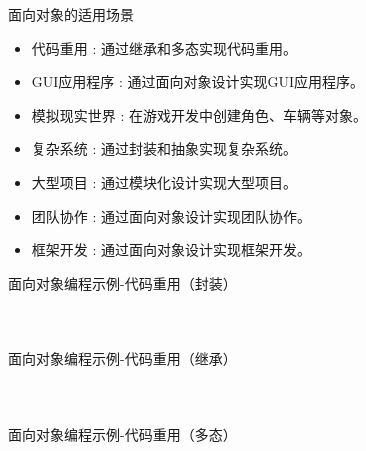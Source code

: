 \documentclass[UTF8,aspectratio=169]{beamer}
\begin{document}
\begin{frame}[fragile]{面向对象的适用场景}
    \begin{itemize}
        \item 代码重用 : 通过继承和多态实现代码重用。
        \item GUI应用程序 : 通过面向对象设计实现GUI应用程序。
        \item 模拟现实世界 : 在游戏开发中创建角色、车辆等对象。
        \item 复杂系统 : 通过封装和抽象实现复杂系统。
        \item 大型项目 : 通过模块化设计实现大型项目。
        \item 团队协作 : 通过面向对象设计实现团队协作。
        \item 框架开发 : 通过面向对象设计实现框架开发。
    \end{itemize}
\end{frame}

\begin{frame}[fragile]{面向对象编程示例-代码重用（封装）}
    \begin{columns}
        \begin{column}{0.48\textwidth}
            \inputminted[firstline=1,lastline=19]{cpp}{code/oop_example_code_reuse_encapsulation.cpp}
        \end{column}
        \begin{column}{0.48\textwidth}
            \inputminted[firstline=20,lastline=38]{cpp}{code/oop_example_code_reuse_encapsulation.cpp}
        \end{column}
    \end{columns}
\end{frame}

\begin{frame}[fragile]{面向对象编程示例-代码重用（继承）}
    \begin{columns}
        \begin{column}{0.48\textwidth}
            \inputminted[firstline=1,lastline=19]{cpp}{code/oop_example_code_reuse_inheritance.cpp}
        \end{column}
        \begin{column}{0.48\textwidth}
            \inputminted[firstline=20,lastline=39]{cpp}{code/oop_example_code_reuse_inheritance.cpp}
        \end{column}
    \end{columns}
\end{frame}

\begin{frame}[fragile]{面向对象编程示例-代码重用（多态）}
    \begin{columns}
        \begin{column}{0.48\textwidth}
            \inputminted[firstline=1,lastline=16]{cpp}{code/oop_example_code_reuse_polymorphism.cpp}
        \end{column}
        \begin{column}{0.48\textwidth}
            \inputminted[firstline=17,lastline=32]{cpp}{code/oop_example_code_reuse_polymorphism.cpp}
        \end{column}
    \end{columns}
\end{frame}
\end{document}
